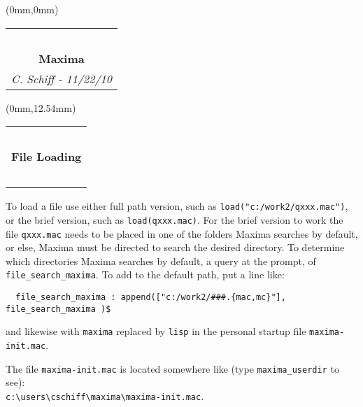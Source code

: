 \documentclass[10pt]{article}
\begin{document}
\null
\begin{textblock*}{7.5in}(0mm,0mm)
\begin{tabular*}{7.5in}{c @{\extracolsep{\fill}} c }
       \tiny ~ & ~\\
       \multicolumn{2}{c}{\normalsize \bf Maxima} \\
       \multicolumn{2}{r}{\scriptsize \emph{C. Schiff - 11/22/10}} \\
\end{tabular*}
\end{textblock*}

\scriptsize
{}
\begin{textblock*}{105mm}(0mm,12.54mm)
\begin{tabular*}{105mm}{c @{\extracolsep{\fill}} c }
       \tiny ~ & ~\\
       \multicolumn{2}{c}{\scriptsize \bf File Loading} \\
       \tiny ~ & ~\\	   
\end{tabular*}
To load a file use either full path version, such as \verb#load("c:/work2/qxxx.mac")#, or
the brief version, such as \verb#load(qxxx.mac)#.  For the brief version to work the 
file \verb#qxxx.mac# needs to be placed in one of the folders Maxima searches by default, 
or else, Maxima must be directed to search the desired directory.  To determine
which directories Maxima searches by default, a query at the prompt, of \verb#file_search_maxima#. 
To add to the default path, put a line like:
\begin{verbatim}
  file_search_maxima : append(["c:/work2/###.{mac,mc}"], file_search_maxima )$
\end{verbatim}
and likewise with \verb#maxima# replaced by \verb#lisp#
in the personal startup file \verb#maxima-init.mac#.

The file \verb#maxima-init.mac# is located somewhere like (type \verb#maxima_userdir# to see):\\
\verb$c:\users\cschiff\maxima\maxima-init.mac$.  

\end{textblock*}
\end{document}
